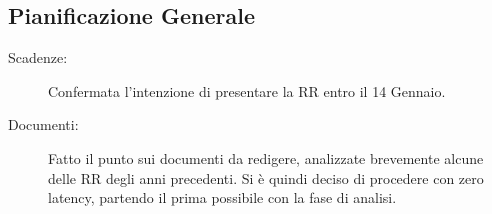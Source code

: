 \documentclass[a4paper, oneside, openany, dvipsnames, table]{article}
\begin{document}
\subsection{Pianificazione Generale}
\begin{description}
\item [Scadenze:] Confermata l’intenzione di presentare la RR entro il 14 Gennaio.
\item [Documenti:] Fatto il punto sui documenti da redigere, analizzate brevemente alcune delle RR degli anni precedenti. Si è quindi deciso di procedere con zero latency, partendo il prima possibile con la fase di analisi.
\end{description}


\newpage
\end{document}
